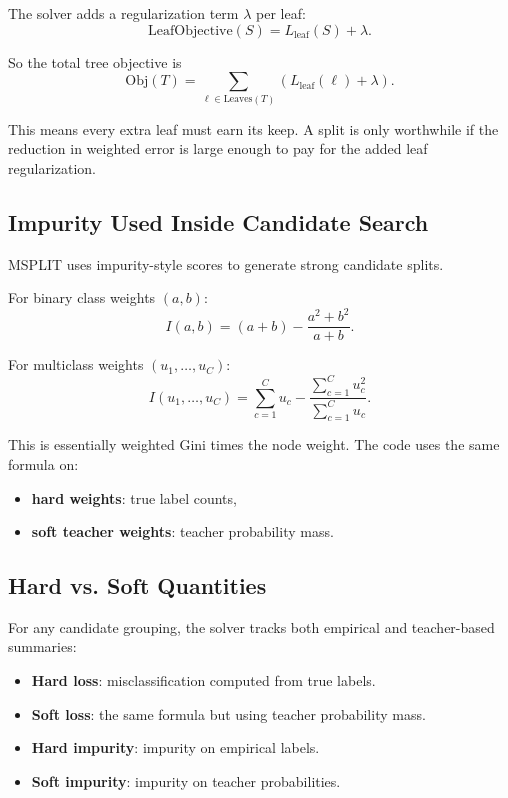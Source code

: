 \documentclass[11pt]{article}
\begin{document}
The solver adds a regularization term \(\lambda\) per leaf:
\[
\mathrm{LeafObjective}(S) = L_{\mathrm{leaf}}(S) + \lambda.
\]

So the total tree objective is
\[
\mathrm{Obj}(T)
=
\sum_{\ell \in \mathrm{Leaves}(T)}
\left(
L_{\mathrm{leaf}}(\ell) + \lambda
\right).
\]

This means every extra leaf must earn its keep. A split is only worthwhile if the reduction in weighted error is large enough to pay for the added leaf regularization.

\subsection{Impurity Used Inside Candidate Search}

MSPLIT uses impurity-style scores to generate strong candidate splits.

For binary class weights \((a,b)\):
\[
I(a,b) = (a+b) - \frac{a^2 + b^2}{a+b}.
\]

For multiclass weights \((u_1,\dots,u_C)\):
\[
I(u_1,\dots,u_C)
=
\sum_{c=1}^C u_c
-
\frac{\sum_{c=1}^C u_c^2}{\sum_{c=1}^C u_c}.
\]

This is essentially weighted Gini times the node weight. The code uses the same formula on:

\begin{itemize}
\item \textbf{hard weights}: true label counts,
\item \textbf{soft teacher weights}: teacher probability mass.
\end{itemize}

\subsection{Hard vs. Soft Quantities}

For any candidate grouping, the solver tracks both empirical and teacher-based summaries:

\begin{itemize}
\item \textbf{Hard loss}: misclassification computed from true labels.
\item \textbf{Soft loss}: the same formula but using teacher probability mass.
\item \textbf{Hard impurity}: impurity on empirical labels.
\item \textbf{Soft impurity}: impurity on teacher probabilities.
\end{itemize}
\end{document}

